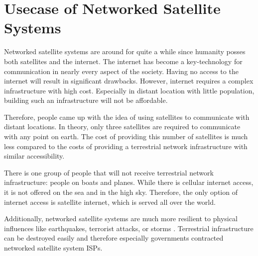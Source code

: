\section{Usecase of Networked Satellite Systems} \label{sec:usecase-networked-satellite-systems}

Networked satellite systems are around for quite a while since humanity posses
both satellites and the internet. The internet has become a key-technology for
communication in nearly every aspect of the society. Having no access to the
internet will result in significant drawbacks. However, internet requires a
complex infrastructure with high cost. Especially in distant location with
little population, building such an infrastructure will not be affordable.

Therefore, people came up with the idea of using satellites to communicate with
distant locations. In theory, only three satellites are required to communicate
with any point on earth. The cost of providing this number of satellites is
much less compared to the costs of providing a terrestrial network
infrastructure with similar accessibility.

There is one group of people that will not receive terrestrial network
infrastructure: people on boats and planes. While there is cellular internet
access, it is not offered on the sea and in the high sky. Therefore, the only
option of internet access is satellite internet, which is served all over the
world.

Additionally, networked satellite systems are much more resilient to physical
influences like earthquakes, terrorist attacks, or storms
\cite{DBLP:conf/pam/StevensIBD24}. Terrestrial infrastructure can be destroyed
easily and therefore especially governments contracted networked satellite
system ISPs.


